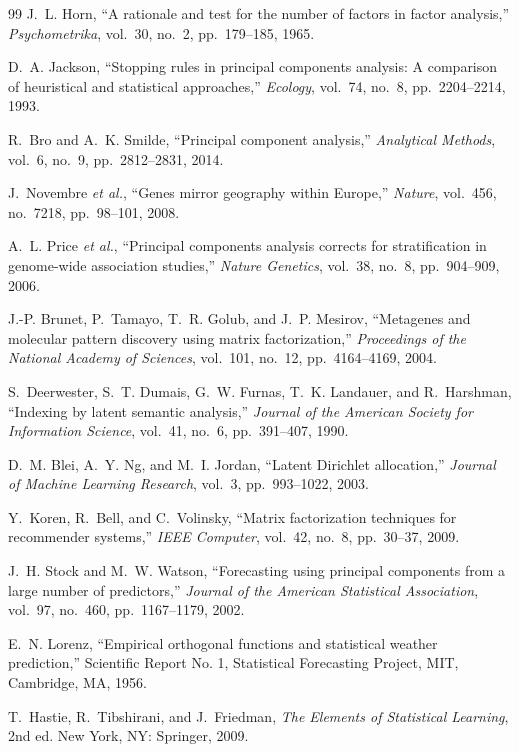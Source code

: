 \documentclass[conference]{IEEEtran}
\begin{document}
\begin{thebibliography}{99}
J.~L. Horn, ``A rationale and test for the number of factors in factor analysis,'' \textit{Psychometrika}, vol.~30, no.~2, pp.~179--185, 1965.

D.~A. Jackson, ``Stopping rules in principal components analysis: A comparison of heuristical and statistical approaches,'' \textit{Ecology}, vol.~74, no.~8, pp.~2204--2214, 1993.

R.~Bro and A.~K. Smilde, ``Principal component analysis,'' \textit{Analytical Methods}, vol.~6, no.~9, pp.~2812--2831, 2014.

J.~Novembre \textit{et al.}, ``Genes mirror geography within Europe,'' \textit{Nature}, vol.~456, no.~7218, pp.~98--101, 2008.

A.~L. Price \textit{et al.}, ``Principal components analysis corrects for stratification in genome-wide association studies,'' \textit{Nature Genetics}, vol.~38, no.~8, pp.~904--909, 2006.

J.-P. Brunet, P.~Tamayo, T.~R. Golub, and J.~P. Mesirov, ``Metagenes and molecular pattern discovery using matrix factorization,'' \textit{Proceedings of the National Academy of Sciences}, vol.~101, no.~12, pp.~4164--4169, 2004.

S.~Deerwester, S.~T. Dumais, G.~W. Furnas, T.~K. Landauer, and R.~Harshman, ``Indexing by latent semantic analysis,'' \textit{Journal of the American Society for Information Science}, vol.~41, no.~6, pp.~391--407, 1990.

D.~M. Blei, A.~Y. Ng, and M.~I. Jordan, ``Latent Dirichlet allocation,'' \textit{Journal of Machine Learning Research}, vol.~3, pp.~993--1022, 2003.

Y.~Koren, R.~Bell, and C.~Volinsky, ``Matrix factorization techniques for recommender systems,'' \textit{IEEE Computer}, vol.~42, no.~8, pp.~30--37, 2009.

J.~H. Stock and M.~W. Watson, ``Forecasting using principal components from a large number of predictors,'' \textit{Journal of the American Statistical Association}, vol.~97, no.~460, pp.~1167--1179, 2002.

E.~N. Lorenz, ``Empirical orthogonal functions and statistical weather prediction,'' Scientific Report No. 1, Statistical Forecasting Project, MIT, Cambridge, MA, 1956.

T.~Hastie, R.~Tibshirani, and J.~Friedman, \textit{The Elements of Statistical Learning}, 2nd ed. New York, NY: Springer, 2009.


\end{thebibliography}
\end{document}

